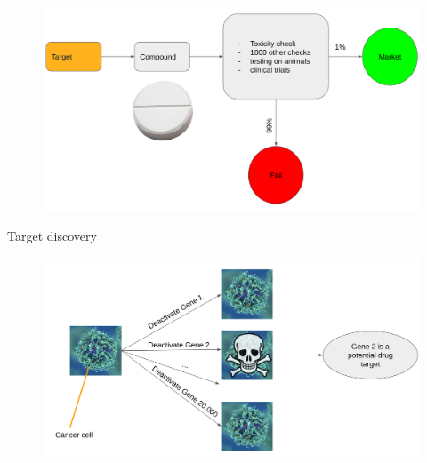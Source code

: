 \documentclass[Nike]{tuberlinbeamer}
\begin{document}

\begin{frame}
  \begin{figure}
    \includegraphics[width=\linewidth]{drugdevelopmenttarget.png}
  \end{figure}
\end{frame}

\begin{frame}{Target discovery}
  \begin{figure}
    \includegraphics[width=\linewidth]{targetdiscovery.png}
  \end{figure}
\end{frame}

\end{document}
